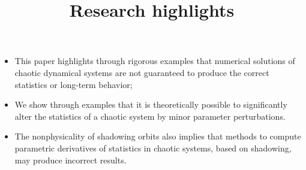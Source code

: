 \documentclass[12pt]{article}
\title{Research highlights}
\begin{document}
\maketitle
\begin{itemize}
\item This paper highlights through rigorous examples that numerical solutions of chaotic dynamical systems are not guaranteed to produce the correct statistics or long-term behavior;
\item We show through examples that it is theoretically possible to significantly alter the statistics of a chaotic system by minor parameter perturbations.
\item The nonphysicality of shadowing orbits also implies that methods to compute parametric derivatives of statistics in chaotic systems, based on shadowing, may produce incorrect results.
\end{itemize}
\end{document}
